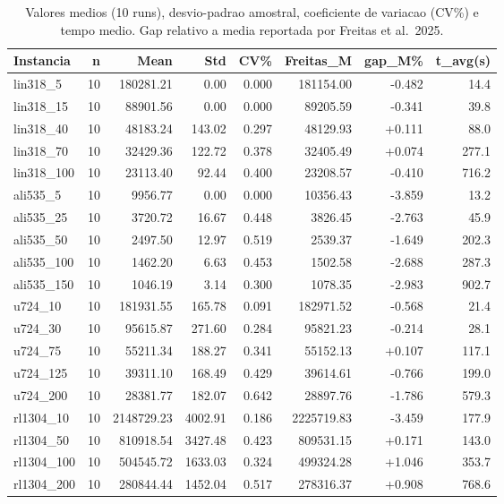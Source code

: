 \begin{table}[!htb]
\centering
\caption{Valores medios (10 runs), desvio-padrao amostral, coeficiente de variacao (CV\%) e tempo medio. Gap relativo a media reportada por Freitas et al.~2025.}
\label{tab:mean}
\small
\begin{tabular}{lrrrrrrr}
\hline
Instancia & n & Mean & Std & CV\% & Freitas\_M & gap\_M\% & t\_avg(s) \\
\hline
lin318\_5 & 10 & 180281.21 & 0.00 & 0.000 & 181154.00 & -0.482 & 14.4 \\
lin318\_15 & 10 & 88901.56 & 0.00 & 0.000 & 89205.59 & -0.341 & 39.8 \\
lin318\_40 & 10 & 48183.24 & 143.02 & 0.297 & 48129.93 & +0.111 & 88.0 \\
lin318\_70 & 10 & 32429.36 & 122.72 & 0.378 & 32405.49 & +0.074 & 277.1 \\
lin318\_100 & 10 & 23113.40 & 92.44 & 0.400 & 23208.57 & -0.410 & 716.2 \\
ali535\_5 & 10 & 9956.77 & 0.00 & 0.000 & 10356.43 & -3.859 & 13.2 \\
ali535\_25 & 10 & 3720.72 & 16.67 & 0.448 & 3826.45 & -2.763 & 45.9 \\
ali535\_50 & 10 & 2497.50 & 12.97 & 0.519 & 2539.37 & -1.649 & 202.3 \\
ali535\_100 & 10 & 1462.20 & 6.63 & 0.453 & 1502.58 & -2.688 & 287.3 \\
ali535\_150 & 10 & 1046.19 & 3.14 & 0.300 & 1078.35 & -2.983 & 902.7 \\
u724\_10 & 10 & 181931.55 & 165.78 & 0.091 & 182971.52 & -0.568 & 21.4 \\
u724\_30 & 10 & 95615.87 & 271.60 & 0.284 & 95821.23 & -0.214 & 28.1 \\
u724\_75 & 10 & 55211.34 & 188.27 & 0.341 & 55152.13 & +0.107 & 117.1 \\
u724\_125 & 10 & 39311.10 & 168.49 & 0.429 & 39614.61 & -0.766 & 199.0 \\
u724\_200 & 10 & 28381.77 & 182.07 & 0.642 & 28897.76 & -1.786 & 579.3 \\
rl1304\_10 & 10 & 2148729.23 & 4002.91 & 0.186 & 2225719.83 & -3.459 & 177.9 \\
rl1304\_50 & 10 & 810918.54 & 3427.48 & 0.423 & 809531.15 & +0.171 & 143.0 \\
rl1304\_100 & 10 & 504545.72 & 1633.03 & 0.324 & 499324.28 & +1.046 & 353.7 \\
rl1304\_200 & 10 & 280844.44 & 1452.04 & 0.517 & 278316.37 & +0.908 & 768.6 \\

\end{tabular}
\end{table}
